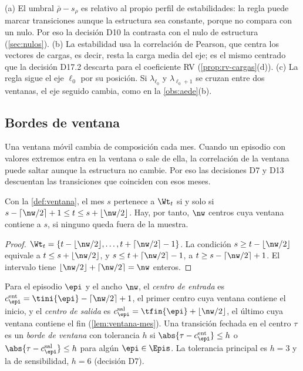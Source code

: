 \begin{observacion}\label{obs:regla06}
(a) El umbral $\bar\rho-s_\rho$ es relativo al propio perfil de estabilidades: la regla puede
marcar transiciones aunque la estructura sea constante, porque no compara con un nulo. Por eso la
decisión D10 la contrasta con el nulo de estructura (\cref{sec:nulos}). (b) La estabilidad usa la
correlación de Pearson, que centra los vectores de cargas, es decir, resta la carga media del eje;
es el mismo centrado que la decisión D17.2 descarta para el coeficiente RV
(\cref{prop:rv-cargas}(d)). (c) La regla sigue el eje $\ell_0$ por su posición. Si
$\lambda_{\ell_0}$ y $\lambda_{\ell_0+1}$ se cruzan entre dos ventanas, el eje seguido cambia, como
en la \cref{obs:aede}(b).
\end{observacion}

\subsection{Bordes de ventana}
\label{sec:bordes}

Una ventana móvil cambia de composición cada mes. Cuando un episodio con valores extremos entra en
la ventana o sale de ella, la correlación de la ventana puede saltar aunque la estructura no
cambie. Por eso las decisiones D7 y D13 descuentan las transiciones que coinciden con esos meses.

\begin{lema}\label{lem:ventana-mes}
Con la \cref{def:ventana}, el mes $s$ pertenece a $\Wt_t$ si y solo si
$s-\lceil\nw/2\rceil+1\le t\le s+\lfloor\nw/2\rfloor$. Hay, por tanto, $\nw$ centros cuya ventana
contiene a $s$, si ninguno queda fuera de la muestra.
\end{lema}

\begin{proof}
$\Wt_t=\{t-\lfloor\nw/2\rfloor,\dots,t+\lceil\nw/2\rceil-1\}$. La condición
$s\ge t-\lfloor\nw/2\rfloor$ equivale a $t\le s+\lfloor\nw/2\rfloor$, y
$s\le t+\lceil\nw/2\rceil-1$, a $t\ge s-\lceil\nw/2\rceil+1$. El intervalo tiene
$\lfloor\nw/2\rfloor+\lceil\nw/2\rceil=\nw$ enteros.
\end{proof}

\begin{definicion}\label{def:borde}
Para el episodio $\epi$ y el ancho $\nw$, el \emph{centro de entrada} es
$c^{\mathrm{ent}}_{\epi}=\tini{\epi}-\lceil\nw/2\rceil+1$, el primer centro cuya ventana contiene el
inicio, y el \emph{centro de salida} es $c^{\mathrm{sal}}_{\epi}=\tfin{\epi}+\lfloor\nw/2\rfloor$, el
último cuya ventana contiene el fin (\cref{lem:ventana-mes}). Una transición fechada en el centro
$\tau$ es un \emph{borde de ventana} con tolerancia $h$ si
$\abs{\tau-c^{\mathrm{ent}}_{\epi}}\le h$ o $\abs{\tau-c^{\mathrm{sal}}_{\epi}}\le h$ para algún
$\epi\in\Epis$. La tolerancia principal es $h=3$ y la de sensibilidad, $h=6$ (decisión D7).
\end{definicion}

